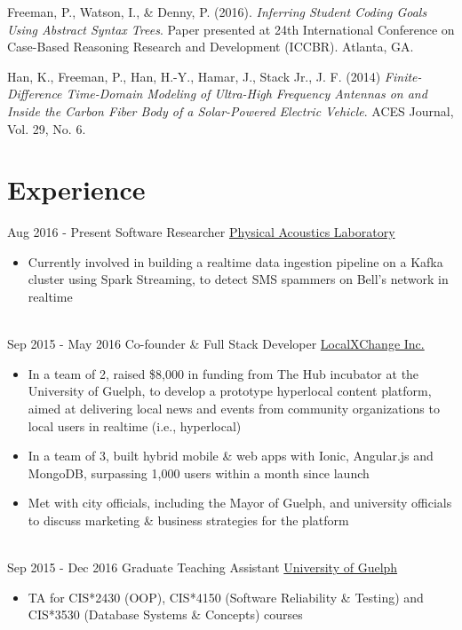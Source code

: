 \documentclass[a4paper]{twentysecondcv} %
\begin{document}
Freeman, P., Watson, I., \& Denny, P. (2016). \emph{Inferring Student Coding
Goals Using Abstract Syntax Trees}. Paper presented at 24th International
Conference on Case-Based Reasoning Research and Development (ICCBR). Atlanta, GA.

Han, K., Freeman, P., Han, H.-Y., Hamar, J., Stack Jr., J. F. (2014)
\emph{Finite-Difference Time-Domain Modeling of Ultra-High Frequency Antennas
on and Inside the Carbon Fiber Body of a Solar-Powered Electric Vehicle}. ACES
Journal, Vol. 29, No. 6.


\section{Experience}

\begin{twenty} %
\twentyitem
    {Aug 2016 -}
    {Present}
    {Software Researcher}
    {\href{https://pal.auckland.ac.nz/}{Physical Acoustics Laboratory}}
    {}
    {
        \begin{itemize}
        \item Currently involved in building a realtime data ingestion pipeline
                on a Kafka cluster using Spark Streaming, to detect SMS
                spammers on Bell's network in realtime
        \end{itemize}
    } \\
\twentyitem
    {Sep 2015 -}
    {May 2016}
    {Co-founder \& Full Stack Developer}
    {\href{http://www.localxchange.ca/}{LocalXChange Inc.}}
    {}
    {{\begin{itemize}
    \item In a team of 2, raised \$8,000 in funding from The Hub incubator at the University of Guelph, to develop a prototype hyperlocal content platform, aimed at delivering local news and events from community organizations to local users in realtime (i.e., hyperlocal)
    \item In a team of 3, built hybrid mobile \& web apps with Ionic, Angular.js and MongoDB, surpassing 1,000 users within a month since launch
    \item Met with city officials, including the Mayor of Guelph, and university officials to discuss marketing \& business strategies for the platform 
\end{itemize}}
    } \\   
\twentyitem
       {Sep 2015 -}
        {Dec 2016}
        {Graduate Teaching Assistant}
        {\href{http://www.uoguelph.ca}{University of Guelph}}
        {}
        {{\begin{itemize}
        \item TA for CIS*2430 (OOP), CIS*4150 (Software Reliability \& Testing) and CIS*3530 (Database Systems \& Concepts) courses
    \end{itemize}}
        }
        
\end{twenty}
\end{document}
